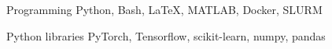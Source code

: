 

\begin{cvskills}

  \cvskill
    {Programming} %
    {Python, Bash, LaTeX, MATLAB, Docker, SLURM} %

  \cvskill
    {Python libraries} %
    {PyTorch, Tensorflow, scikit-learn, numpy, pandas} %

\end{cvskills}

\clearpage
